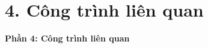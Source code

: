 \documentclass[10pt, aspectratio=169]{beamer}
\begin{document}






\section{4. Công trình liên quan}

\begin{frame}
    \centering
    \Huge \textbf{Phần 4: Công trình liên quan}
\end{frame}
\end{document}
